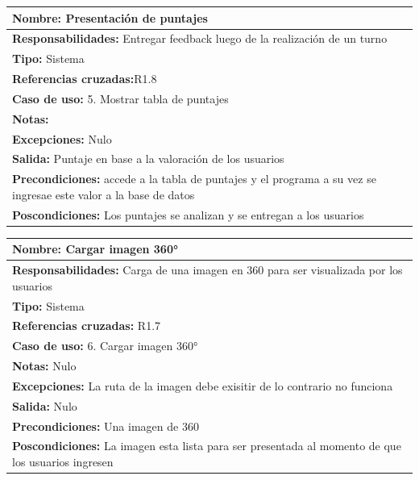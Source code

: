 \begin{table}[H]
    \begin{center}
        \begin{tabular}{| m{15cm} |}        
        	\hline 
        	\textbf{Nombre:} Presentación de puntajes \\
        	\hline
        	\textbf{Responsabilidades: }Entregar feedback luego de la realización de un turno \\
        	\hline
        	\textbf{Tipo:} Sistema \\
        	\hline
        	\textbf{Referencias cruzadas:}R1.8 \\
        	\hline
        	\textbf{Caso de uso:} 5. Mostrar tabla de puntajes\\
        	\hline
        	\textbf{Notas:} \\
        	\hline
        	\textbf{Excepciones:} Nulo \\
        	\hline
        	\textbf{Salida:} Puntaje en base a la valoración de los usuarios\\
        	\hline
        	\textbf{Precondiciones:}  accede a la tabla de puntajes y el programa a su vez se ingresae este valor a la base de datos \\
        	\hline
        	\textbf{Poscondiciones:} Los puntajes se analizan y se entregan a los usuarios\\
        	\hline
        \end{tabular}
    \end{center}
\end{table}

\begin{table}[H]
    \begin{center}
        \begin{tabular}{| m{15cm} |}          
        	\hline 
        	\textbf{Nombre:} Cargar imagen 360°\\
        	\hline
        	\textbf{Responsabilidades:} Carga de una imagen en 360 para ser visualizada por los usuarios\\
        	\hline
        	\textbf{Tipo:} Sistema\\
        	\hline
        	\textbf{Referencias cruzadas:} R1.7\\
        	\hline
        	\textbf{Caso de uso:} 6. Cargar imagen 360°\\
        	\hline
        	\textbf{Notas:} Nulo\\
        	\hline
        	\textbf{Excepciones:} La ruta de la imagen debe exisitir de lo contrario no funciona\\
        	\hline
        	\textbf{Salida:} Nulo\\
        	\hline
        	\textbf{Precondiciones:} Una imagen de 360 \\
        	\hline
        	\textbf{Poscondiciones:} La imagen esta lista para ser presentada al momento de que los usuarios ingresen\\
        	\hline
        \end{tabular}
    \end{center}
\end{table}


